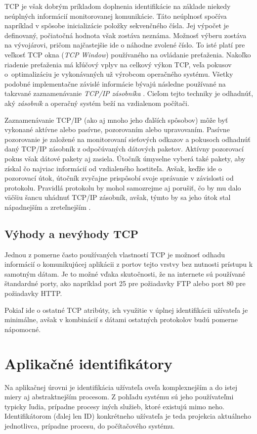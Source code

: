 \documentclass[
  printed, %
  table,   %
  lof,     %
  nolot,   %
  nocover
]{fithesis3}
\begin{document}
TCP je však dobrým príkladom doplnenia identifikácie na základe niekedy neúplných
informácií monitorovanej komunikácie. Táto neúplnosť spočíva napríklad v
spôsobe inicializácie položky sekvenčného čísla. Jej výpočet je definovaný,
počiatočná hodnota však zostáva neznáma. Možnosť výberu zostáva na vývojárovi,
pričom najčastejšie ide o náhodne zvolené číslo. To isté platí pre veľkosť TCP
okna (\textit{TCP Window}) používaného na ovládanie preťaženia. Nakoľko
riadenie preťaženia má kľúčový vplyv na celkový výkon TCP, veľa pokusov
o~optimalizáciu je vykonávaných už výrobcom operačného systému.
Všetky podobné implementačne závislé informácie bývajú následne používané na takzvané
zaznamenávanie \textit{TCP/IP zásobníka} \cite{FIDIS:TCP}. Cieľom tejto techniky je odhadnúť,
aký \textit{zásobník} a operačný systém beží na vzdialenom počítači.

Zaznamenávanie TCP/IP (ako aj mnoho jeho ďalších spôsobov) môže byť vykonané
aktívne alebo pasívne, pozorovaním alebo upravovaním. Pasívne pozorovanie je
založené na monitorovaní sieťových odkazov a pokusoch odhadnúť daný TCP/IP
zásobník z odpočúvaných dátových paketov. Aktívny pozorovací pokus však dátové
pakety aj zasiela. Útočník úmyselne vyberá také pakety, aby získal čo najviac
informácií od vzdialeného hostiteľa. Avšak, keďže ide o pozorovací útok,
útočník zvyčajne prispôsobí svoje správanie v závislosti od protokolu. Pravidlá
protokolu by mohol samozrejme aj porušiť, čo by mu dalo väčšiu šancu uhádnuť
TCP/IP zásobník, avšak, týmto by sa jeho útok stal nápadnejším a zreteľnejším \cite{FIDIS:TCP}.
 
\subsection{Výhody a nevýhody TCP}
Jednou z pomerne často používaných vlastností TCP je možnosť odhadu informácií
o komunikujúcej aplikácii z portov tejto vrstvy bez nutnosti prístupu k samotným
dátam. Je to možné vďaka skutočnosti, že na internete sú používané štandardné
porty, ako napríklad port 25 pre požiadavky FTP alebo port 80 pre požiadavky HTTP.

Pokiaľ ide o ostatné TCP atribúty, ich využitie v úplnej identifikácii
užívateľa je minimálne, avšak v kombinácií s dátami ostatných protokolov budú
pomerne nápomocné.

\section{Aplikačné identifikátory}
Na aplikačnej úrovni je identifikácia užívateľa oveľa komplexnejším a do istej
miery aj abstraktnejším procesom. Z pohľadu systému sú jeho používateľmi
typicky ľudia, prípadne procesy iných služieb, ktoré existujú mimo neho.
Identifikátorom (ďalej len ID) konkrétneho užívateľa je teda projekcia aktuálneho
jednotlivca, prípadne procesu, do počítačového systému.
\end{document}
